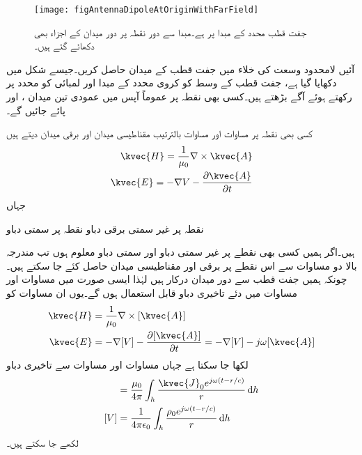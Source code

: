 \begin{figure}
\centering
\texttt{[image: figAntennaDipoleAtOriginWithFarField]}
\caption{جفت قطب محدد کے مبدا پر ہے۔مبدا سے دور نقطہ  پر دور میدان کے اجزاء بھی دکھائے گئے ہیں۔}
\label{شکل_اینٹینا_جفت_قطب_اور_اس_کے_دور_میدان}
\end{figure}

آئیں لامحدود وسعت کی خلاء میں جفت قطب کے میدان حاصل کریں۔جیسے شکل  میں دکھایا گیا ہے، جفت قطب کے وسط کو کروی محدد کے مبدا اور لمبائی کو  محدد پر رکھتے ہوئے آگے بڑھتے ہیں۔کسی بھی نقطہ  پر عموماً آپس میں عمودی تین میدان ،  اور  پائے جائیں گے۔


کسی بھی نقطہ  پر مساوات   اور مساوات  بالترتیب مقناطیسی میدان اور برقی میدان دیتے ہیں
\begin{align}
\kvec{H}=\frac{1}{\mu_0}\nabla \times \kvec{A} \\
\kvec{E}=-\nabla V-\frac{\partial \kvec{A}}{\partial t}
\end{align}
جہاں
\begin{description}
 نقطہ  پر غیر سمتی برقی دباو
 نقطہ  پر سمتی دباو
\end{description}
ہیں۔اگر ہمیں کسی بھی نقطے پر غیر سمتی دباو  اور سمتی دباو  معلوم ہوں تب مندرجہ بالا دو مساوات سے اس نقطے پر برقی اور مقناطیسی میدان حاصل کئے جا سکتے ہیں۔چونکہ ہمیں  جفت قطب سے دور میدان درکار ہیں لہٰذا ایسی صورت میں مساوات  اور مساوات  میں دئے تاخیری دباو قابل استعمال ہوں گے۔یوں ان مساوات کو
\begin{align}
\kvec{H}&=\frac{1}{\mu_0}\nabla \times [\kvec{A}] \label{مساوات_اینٹینا_عمومی_مقناطیسی}\\
\kvec{E}&=-\nabla [V]-\frac{\partial [\kvec{A}]}{\partial t}=-\nabla [V]-j \omega [\kvec{A}]\label{مساوات_اینٹینا_عمومی_برقی}
\end{align}
لکھا جا سکتا ہے جہاں مساوات  اور مساوات  سے تاخیری دباو
\begin{align}
[\kvec{A}]&=\frac{\mu_0}{4\pi} \int_h \frac{\kvec{J}_0 e^{j \omega(t-r/c)}}{r} \dif h \label{مساوات_اینٹینا_عمومی_سمتی_دباو}\\
[V]&=\frac{1}{4\pi\epsilon_0}\int_h \frac{\rho_0 e^{j\omega(t-r/c)}}{r} \dif h\label{مساوات_اینٹینا_عمومی_غیر_سمتی_دباو}
\end{align}
لکھے جا سکتے ہیں۔

